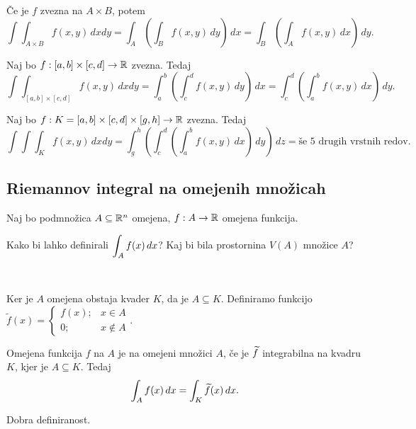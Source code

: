 \begin{posledica}
    Če je \(f\) zvezna na \(A \times B\), potem \[\int \int_{A \times B} f(x,y) \, dxdy = \int_A \left(\int_B f(x,y) \, dy\right) \, dx = \int_B \left(\int_A f(x,y) \, dx\right) \, dy.\]
\end{posledica}

\begin{posledica}
    Naj bo \(f:[a,b] \times [c,d] \to \mathbb{R}\) zvezna. Tedaj
    \[\int \int_{[a,b] \times [c,d]} f(x,y) \, dxdy = \int_a^b \left(\int_c^d f(x,y) \, dy\right) \, dx = \int_c^d \left(\int_a^b f(x,y) \, dx\right) \, dy.\]
\end{posledica}

\begin{posledica}
    Naj bo \(f: K = [a,b] \times [c,d] \times [g, h] \to \mathbb{R}\) zvezna. Tedaj
    \[\int \int \int_K f(x,y) \, dxdy = \int_g^h \left( \int_c^d \left(\int_a^b f(x,y) \, dx\right) \, dy\right) \, dz = \text{še \(5\) drugih vrstnih redov}.\]
\end{posledica}

\begin{zgled}
    \todo
\end{zgled}

\subsection{Riemannov integral na omejenih množicah}
Naj bo podmnožica \(A \subseteq \mathbb{R}^n\) omejena, \(f: A \to \mathbb{R}\) omejena funkcija. 

Kako bi lahko definirali \(\displaystyle \int_A f(x) \, dx\)? Kaj bi bila prostornina \(V(A)\) množice \(A\)?

\

Ker je \(A\) omejena obstaja kvader \(K\), da je \(A \subseteq K\). Definiramo funkcijo \(\widetilde{f}(x) =  \begin{cases}
    f(x); & x \in A \\ 0; & x \notin A
\end{cases}.\)

\begin{definicija}
    Omejena funkcija \(f\) na \(A\) je  na omejeni množici \(A\), če je \(\widetilde{f}\) integrabilna na kvadru \(K\), kjer je \(A \subseteq K\). Tedaj \[\int_A f(x) \, dx = \int_K \widetilde{f}(x) \, dx.\]
\end{definicija}

\begin{opomba}
    Dobra definiranost. \todo
\end{opomba}


